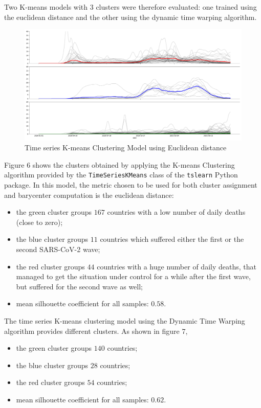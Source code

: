 \documentclass[11pt,a4paper]{article}
\begin{document}
Two K-means models with
3 clusters were therefore evaluated: one trained using the euclidean distance
and the other using the dynamic time warping algorithm.
\begin{figure}[H]
    \begin{center}
        \includegraphics[scale=0.32]{img/daily-deaths-euclidean-clusters.pdf}
    \end{center}
    \vspace{-0.3cm}
    \caption{Time series K-means Clustering Model using Euclidean distance}
\end{figure}
\noindent
Figure 6 shows the clusters obtained by applying the K-means Clustering
algorithm provided by the \texttt{TimeSeriesKMeans} class of the
\texttt{tslearn} Python package. In this model, the metric chosen to be used for
both cluster assignment and barycenter computation is the euclidean distance:
\begin{itemize}
    \item the {\color{ForestGreen}green cluster} groups $167$ countries with
    a low number of daily deaths (close to zero);
    \item the {\color{blue}blue cluster} groups $11$ countries which suffered
    either the first or the second SARS-CoV-2 wave;
    \item the {\color{red}red cluster} groups $44$ countries with a huge number
    of daily deaths, that managed to get the situation under control for a while
    after the first wave, but suffered for the second wave as well;
    \item mean silhouette coefficient for all samples: $0.58$.
\end{itemize}
The time series K-means clustering model using the Dynamic Time Warping
algorithm provides different clusters. As shown in figure 7,
\begin{itemize}
    \item the {\color{ForestGreen}green cluster} groups $140$ countries;
    \item the {\color{blue}blue cluster} groups $28$ countries;
    \item the {\color{red}red cluster} groups $54$ countries;
    \item mean silhouette coefficient for all samples: $0.62$.
\end{itemize}
\end{document}
